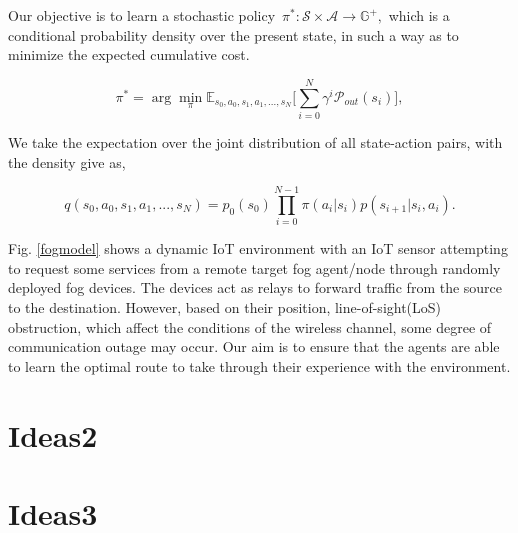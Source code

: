 \documentclass[journal]{IEEEtran}
\begin{document}
Our objective is to learn a stochastic policy~$\pi^*: \mathcal{S}\times \mathcal{A}\rightarrow \mathbb{G}^+,$ which is a conditional probability density over the present state, in such a way as to minimize the expected cumulative cost.


\begin{equation}\label{eqn4}
\pi^* = \arg \min_{\pi} \mathbb{E}_{s_0, a_0, s_1, a_1, ..., s_N} \Big[ \sum_{i=0}^{N} \gamma^i \mathcal{P}_{out}(s_i) \Big],
\end{equation}

We take the expectation over the joint distribution of all state-action pairs, with the density give as,

\begin{equation}\label{eqn5}
q(s_0, a_0, s_1, a_1, ..., s_N) = p_0(s_0) \prod_{i=0}^{N-1} \pi(a_i|s_i) p(s_{i+1}|s_i, a_i).
\end{equation}



Fig. \ref{fogmodel} shows a dynamic IoT environment with an IoT sensor attempting to request some services from a remote target fog agent/node through randomly deployed fog devices. The devices act as relays to forward traffic from the source to the destination. However, based on their position, line-of-sight(LoS) obstruction, which affect the conditions of the wireless channel, some degree of communication outage may occur. Our aim is to ensure that the agents are able to learn the optimal route to take through their experience with the environment.

\section{Ideas2}\label{sec:Ideas2}

\section{Ideas3}\label{sec:Ideas3}








\end{document}
